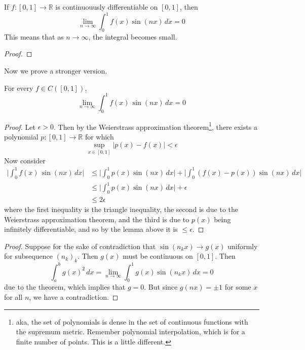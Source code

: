   \begin{lemma} 
    If $f: [0, 1] \to \mathbb{R}$ is continuouusly differentiable on $[0, 1]$, then 
    \begin{equation}
      \lim_{n \to \infty} \int_0^1 f(x) \sin(nx) \,dx = 0
    \end{equation} 
    This means that as $n \to \infty$, the integral becomes small. 
  \end{lemma}
  \begin{proof}
    
  \end{proof}

  Now we prove a stronger version. 

  \begin{theorem}
    For every $f \in C([0, 1])$, 
    \begin{equation}
      \lim_{n \to \infty} \int_0^1 f(x)\, \sin(nx) \,dx = 0
    \end{equation}
  \end{theorem}
  \begin{proof}
    Let $\epsilon > 0$. Then by the Weierstrass approximation theorem\footnote{aka, the set of polynomials is dense in the set of continuous functions with the supremum metric. Remember polynomial interpolation, which is for a finite number of points. This is a little different.}, there exists a polynomial $p: [0, 1] \to \mathbb{R}$ for which 
    \begin{equation}
      \sup_{x \in [0, 1]} | p(x) - f(x)| < \epsilon 
    \end{equation}
    Now consider 
    \begin{align}
      \bigg| \int_0^1 f(x) \, \sin(nx) \,dx \bigg| & \leq \bigg| \int_0^1 p(x) \sin(nx) \,dx \bigg| + \bigg| \int_0^1 (f(x) - p(x)) \sin(nx) \,dx \bigg| \\
                                                   & \leq \bigg| \int_0^1 p(x) \sin(nx) \,dx \bigg| + \epsilon \\
                                                   & \leq 2 \epsilon 
    \end{align}
    where the first inequality is the triangle inequality, the second is due to the Weierstrass approximation theorem, and the third is due to $p(x)$ being infinitely differentiable, and so by the lemma above it is $\leq \epsilon$. 

  \end{proof}

  \begin{theorem}
    
  \end{theorem}
  \begin{proof}
    Suppose for the sake of contradiction that $\sin(n_k x) \to g(x)$ uniformly for subsequence $(n_k)_k$. Then $g(x)$ must be continuous on $[0, 1]$. Then 
    \begin{equation} 
      \int_a^b g(x)^2 \,dx = \lim_{n \to \infty} \int_0^1 g(x) \sin(n_k x) \,dx = 0
    \end{equation}
    due to the theorem, which implies that $g = 0$. But since $g(nx) = \pm 1$ for some $x$ for all $n$, we have a contradiction. 
  \end{proof}

